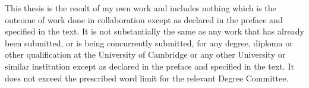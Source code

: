 
\begin{declaration}

    This thesis is the result of my own work and includes nothing which is the outcome of work done in collaboration except as declared in the preface and specified in the text. It is not substantially the same as any work that has already been submitted, or is being concurrently submitted, for any degree, diploma or other qualification at the University of Cambridge or any other University or similar institution except as declared in the preface and specified in the text. It does not exceed the prescribed word limit for the relevant Degree Committee.
    


\end{declaration}

